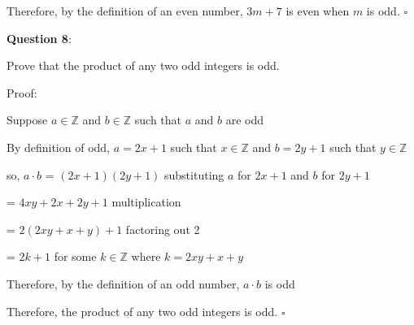 \documentclass{article} %
\newcommand{\question}[2][]{\begin{flushleft}
        \textbf{Question #1}: \textit{#2}

\end{flushleft}}
\begin{document}
    Therefore, by the definition of an even number, $3m + 7$ is even when $m$ is odd. $\square$

    \newpage

    \question[8]{}

    Prove that the product of any two odd integers is odd.

    Proof:

    Suppose $a \in \mathbb{Z}$ and $b \in \mathbb{Z}$ such that $a$ and $b$ are odd

    By definition of odd, $a = 2x + 1$ such that $x \in \mathbb{Z}$ and $b = 2y + 1$ such that $y \in \mathbb{Z}$

    so, $a \cdot b$ = $(2x + 1)(2y + 1)$ substituting $a$ for $2x + 1$ and $b$ for $2y + 1$

    \tabto*{1.78cm} = $4xy + 2x + 2y + 1$ multiplication

    \tabto*{1.78cm} = $2(2xy + x + y) + 1$ factoring out 2

    \tabto*{1.78cm} = $2k + 1$ for some $k \in \mathbb{Z}$ where $k = 2xy + x + y$

    Therefore, by the definition of an odd number, $a \cdot b$ is odd

    Therefore, the product of any two odd integers is odd. $\square$



    
\end{document}
